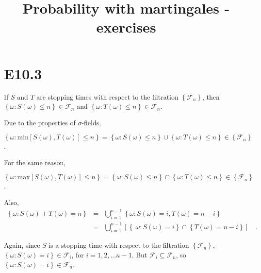 \documentclass[11pt]{article} %
\title{Probability with martingales - exercises}
\author{}
\date{} %
\begin{document}
{\bf \maketitle \par}


\section*{E10.3}

\vspace{\baselineskip}

If $S$ and $T$ are stopping times with respect to the filtration $\left\lbrace \mathcal{F}_{n} \right\rbrace$, then $\left\lbrace \omega : S\left(\omega\right) \leq n\right\rbrace \in \mathcal{F}_{n}$ and $\left\lbrace \omega : T\left(\omega\right) \leq n\right\rbrace \in \mathcal{F}_{n}$.

Due to the properties of $\sigma$-fields, 

$\left\lbrace \omega : \mathrm{min}\left[S\left(\omega\right),T\left(\omega\right)\right] \leq n\right\rbrace= \left\lbrace \omega : S\left(\omega\right) \leq n \right\rbrace \cup \left\lbrace \omega : T\left(\omega\right) \leq n \right\rbrace \in \left\lbrace \mathcal{F}_{n} \right\rbrace$.

\vspace{\baselineskip}

For the same reason,

$\left\lbrace \omega : \mathrm{max}\left[S\left(\omega\right),T\left(\omega\right)\right] \leq n\right\rbrace= \left\lbrace \omega : S\left(\omega\right) \leq n \right\rbrace \cap \left\lbrace \omega : T\left(\omega\right) \leq n \right\rbrace \in \left\lbrace \mathcal{F}_{n} \right\rbrace$.


\vspace{\baselineskip}
Also,
\begin{equation*}
\begin{array}{lcl}
\left\lbrace \omega : S(\omega)+T(\omega)=n\right\rbrace&=&\displaystyle \bigcup_{i=1}^{n-1}\left\lbrace \omega : S(\omega)=i, T(\omega)=n-i\right\rbrace\\
&=&\displaystyle \bigcup_{i=1}^{n-1}\left[\left\lbrace\ \omega : S(\omega)=i\right\rbrace \cap \left\lbrace T(\omega)=n-i\right\rbrace \right] \quad.
\end{array}
\end{equation*}

\vspace{\baselineskip}
Again, since $S$ is a stopping time with respect to the filtration $\left\lbrace \mathcal{F}_{n} \right\rbrace$, $\left\lbrace \omega : S(\omega)=i \right\rbrace \in \mathcal{F}_{i}$, for $i=1,2,... n-1$. But $\mathcal{F}_{i} \subseteq \mathcal{F}_{n} $, so $\left\lbrace \omega : S(\omega)=i \right\rbrace \in \mathcal{F}_{n}$. 
\end{document}
